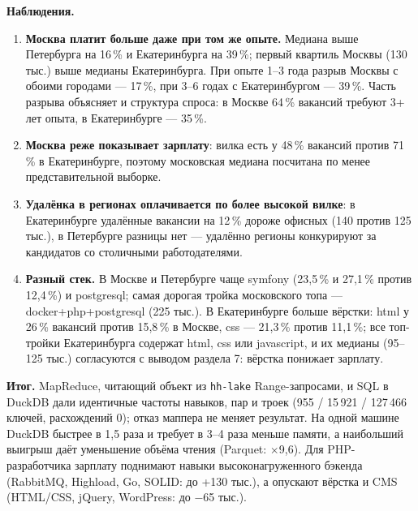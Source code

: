 \documentclass[11pt,a4paper]{article}
\newcommand{\code}[1]{\texttt{#1}}
\begin{document}
\textbf{Наблюдения.}
\begin{enumerate}
  \item \textbf{Москва платит больше даже при том же опыте.} Медиана выше Петербурга на 16\,\% и Екатеринбурга на 39\,\%; первый квартиль Москвы (130 тыс.) выше медианы Екатеринбурга. При опыте 1--3 года разрыв Москвы с обоими городами --- 17\,\%, при 3--6 годах с Екатеринбургом --- 39\,\%. Часть разрыва объясняет и структура спроса: в Москве 64\,\% вакансий требуют 3+ лет опыта, в Екатеринбурге --- 35\,\%.
  \item \textbf{Москва реже показывает зарплату}: вилка есть у 48\,\% вакансий против 71\,\% в Екатеринбурге, поэтому московская медиана посчитана по менее представительной выборке.
  \item \textbf{Удалёнка в регионах оплачивается по более высокой вилке}: в Екатеринбурге удалённые вакансии на 12\,\% дороже офисных (140 против 125 тыс.), в Петербурге разницы нет --- удалённо регионы конкурируют за кандидатов со столичными работодателями.
  \item \textbf{Разный стек.} В Москве и Петербурге чаще symfony (23,5\,\% и 27,1\,\% против 12,4\,\%) и postgresql; самая дорогая тройка московского топа --- docker+php+postgresql (225 тыс.). В Екатеринбурге больше вёрстки: html у 26\,\% вакансий против 15,8\,\% в Москве, css --- 21,3\,\% против 11,1\,\%; все топ-тройки Екатеринбурга содержат html, css или javascript, и их медианы (95--125 тыс.) согласуются с выводом раздела 7: вёрстка понижает зарплату.
\end{enumerate}

\begin{keybox}
\textbf{Итог.} MapReduce, читающий объект из \code{hh-lake} Range-запросами, и SQL в DuckDB дали идентичные частоты навыков, пар и троек (955 / 15\,921 / 127\,466 ключей, расхождений 0); отказ маппера не меняет результат. На одной машине DuckDB быстрее в 1,5 раза и требует в 3--4 раза меньше памяти, а наибольший выигрыш даёт уменьшение объёма чтения (Parquet: $\times$9,6). Для PHP-разработчика зарплату поднимают навыки высоконагруженного бэкенда (RabbitMQ, Highload, Go, SOLID: до +130 тыс.), а опускают вёрстка и CMS (HTML/CSS, jQuery, WordPress: до $-$65 тыс.).
\end{keybox}
\end{document}
